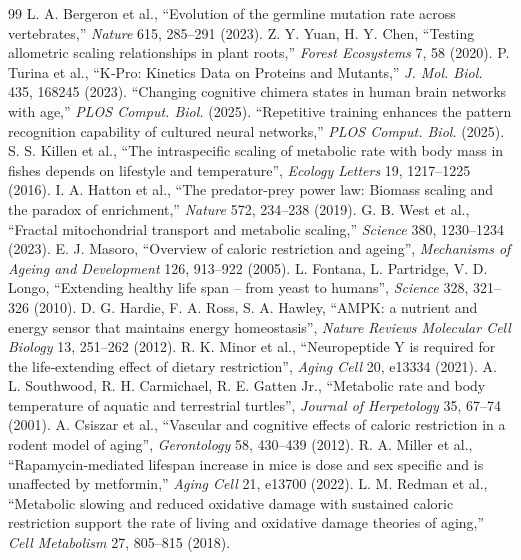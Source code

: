 \documentclass[11pt,a4paper]{article}
\begin{document}
	\begin{thebibliography}{99}
		 L. A. Bergeron et al., ``Evolution of the germline mutation rate across vertebrates,'' \emph{Nature} 615, 285–291 (2023).
		 Z. Y. Yuan, H. Y. Chen, ``Testing allometric scaling relationships in plant roots,'' \emph{Forest Ecosystems} 7, 58 (2020).
		 P. Turina et al., ``K‑Pro: Kinetics Data on Proteins and Mutants,'' \emph{J. Mol. Biol.} 435, 168245 (2023).
		 ``Changing cognitive chimera states in human brain networks with age,'' \emph{PLOS Comput. Biol.} (2025).
		 ``Repetitive training enhances the pattern recognition capability of cultured neural networks,'' \emph{PLOS Comput. Biol.} (2025).
		 S. S. Killen et al., ``The intraspecific scaling of metabolic rate with body mass in fishes depends on lifestyle and temperature'', \emph{Ecology Letters} 19, 1217–1225 (2016).
		 I. A. Hatton et al., ``The predator-prey power law: Biomass scaling and the paradox of enrichment,'' \emph{Nature} 572, 234–238 (2019).
		 G. B. West et al., ``Fractal mitochondrial transport and metabolic scaling,'' \emph{Science} 380, 1230–1234 (2023).
		 E. J. Masoro, ``Overview of caloric restriction and ageing'', \emph{Mechanisms of Ageing and Development} 126, 913–922 (2005).
		 L. Fontana, L. Partridge, V. D. Longo, ``Extending healthy life span – from yeast to humans'', \emph{Science} 328, 321–326 (2010).
		 D. G. Hardie, F. A. Ross, S. A. Hawley, ``AMPK: a nutrient and energy sensor that maintains energy homeostasis'', \emph{Nature Reviews Molecular Cell Biology} 13, 251–262 (2012).
		 R. K. Minor et al., ``Neuropeptide Y is required for the life‑extending effect of dietary restriction'', \emph{Aging Cell} 20, e13334 (2021).
		 A. L. Southwood, R. H. Carmichael, R. E. Gatten Jr., ``Metabolic rate and body temperature of aquatic and terrestrial turtles'', \emph{Journal of Herpetology} 35, 67–74 (2001).
		 A. Csiszar et al., ``Vascular and cognitive effects of caloric restriction in a rodent model of aging'', \emph{Gerontology} 58, 430–439 (2012).
		 R. A. Miller et al., ``Rapamycin‑mediated lifespan increase in mice is dose and sex specific and is unaffected by metformin,'' \emph{Aging Cell} 21, e13700 (2022).
		 L. M. Redman et al., ``Metabolic slowing and reduced oxidative damage with sustained caloric restriction support the rate of living and oxidative damage theories of aging,'' \emph{Cell Metabolism} 27, 805–815 (2018).

\end{thebibliography}
\end{document}
